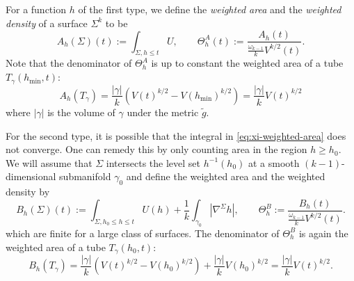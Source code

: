 \documentclass[11pt]{article}
\begin{document}
For a function \(h\) of the first type, we define the \emph{weighted area} and the \emph{weighted density} of a surface \(\Sigma^k\) to be
\begin{equation}
\label{eq:xi-weighted-area}
 A_h(\Sigma)(t) := \int_{\Sigma,h\leq t}U,\qquad \Theta^A_h(t) := \frac{A_h(t)}{\frac{\omega_{k-1}}{k}V^{k/2}(t)}.
\end{equation}
Note that the denominator of \(\Theta_h^A\) is up to constant the weighted area of
a tube \(T_\gamma(h_{\min},t)\):
\begin{equation}
\label{eq:area-tube-1}
A_h(T_\gamma)= \frac{|\gamma|}{k} \left(V(t)^{k/2}- V(h_{\min})^{k/2}\right) = \frac{|\gamma|}{k} V(t)^{k/2}
\end{equation}
where \(|\gamma|\) is the volume of \(\gamma\) under the metric \(\tilde g\).

For the second type, it is possible that the integral
in \eqref{eq:xi-weighted-area} does not converge. One can remedy this by only counting
area in the region \(h\geq h_0\). We will assume that \(\Sigma\) intersects
the level set \(h^{-1}(h_0)\) at a smooth \((k-1)\)-dimensional submanifold \(\gamma_0\) and define the weighted area and the weighted density by
\begin{equation}
\label{eq:xi-weighted-area-plus}
B_h(\Sigma)(t):= \int_{\Sigma,h_0\leq h\leq t}U(h) + \frac{1}{k}\int_{\gamma_0}|\nabla^\Sigma h|,\qquad \Theta_h^B:=
\frac{B_h(t)}{\frac{\omega_{k-1}}{k}V^{k/2}(t)}.
\end{equation}
which are finite for a large class of surfaces. The denominator of \(\Theta^B_h\) is again the
weighted area of a tube \(T_\gamma(h_0,t)\):
\begin{equation}
\label{eq:area-tube-2}
 B_h(T_\gamma)= \frac{|\gamma|}{k}(V(t)^{k/2} - V(h_0)^{k/2}) + \frac{|\gamma|}{k}V(h_0)^{k/2} = \frac{|\gamma|}{k}V(t)^{k/2}.
\end{equation}
\end{document}
